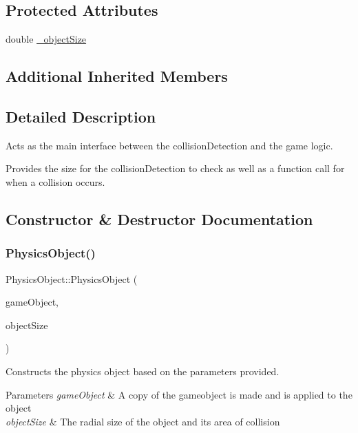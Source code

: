 \subsection*{Protected Attributes}
\begin{DoxyCompactItemize}
\item 
double \hyperlink{class_physics_object_a417a7eb051cfcfdbf8dfd0cc0875fa0d}{\+\_\+object\+Size}
\end{DoxyCompactItemize}
\subsection*{Additional Inherited Members}


\subsection{Detailed Description}
Acts as the main interface between the collision\+Detection and the game logic. 

Provides the size for the collision\+Detection to check as well as a function call for when a collision occurs. 

\subsection{Constructor \& Destructor Documentation}
\mbox{\label{class_physics_object_a8a92618716bd764c63f0ca80436a950c}} 
\subsubsection{\texorpdfstring{Physics\+Object()}{PhysicsObject()}}
{\footnotesize\ttfamily Physics\+Object\+::\+Physics\+Object (\begin{DoxyParamCaption}\item[{const \hyperlink{class_game_object}{Game\+Object} \&}]{game\+Object,  }\item[{const double \&}]{object\+Size }\end{DoxyParamCaption})}



Constructs the physics object based on the parameters provided. 


\begin{DoxyParams}{Parameters}
{\em game\+Object} & A copy of the gameobject is made and is applied to the object \\
\hline
{\em object\+Size} & The radial size of the object and its area of collision \\
\hline
\end{DoxyParams}


